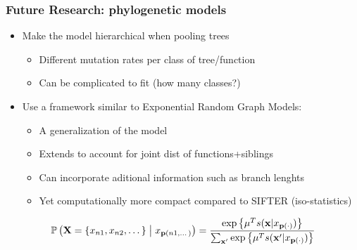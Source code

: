 \documentclass[aspectratio=169, 9pt]{beamer}\usepackage[]{graphicx}\usepackage[]{color}
\begin{document}
\begin{frame}[t]
\frametitle{Future Research: phylogenetic models}

\begin{itemize}
\item Make the model hierarchical when pooling trees\pause
\begin{itemize}
\item Different mutation rates per class of tree/function
\item Can be complicated to fit (how many classes?)
\end{itemize}\pause
\item Use a framework similar to Exponential Random Graph Models:\pause
\begin{itemize}
\item A generalization of the model
\item Extends to account for joint dist of functions+siblings
\item Can incorporate aditional information such as branch lenghts
\item Yet computationally more compact compared to SIFTER (iso-statistics)
\end{itemize}
\end{itemize}
\pause
$$
\Prcond{\Ann=\{\ann{n1}, \ann{n2},\dots\}}{\ann{\parent{n1, \dots}}} = \frac{\exp{\mu^{T} s(\mathbf{x}|\ann{\parent{\cdot}})}}{\sum_{\mathbf{x}'}\exp{\mu^{T} s(\mathbf{x}'|\ann{\parent{\cdot}})}}
$$


\end{frame}
\end{document}
